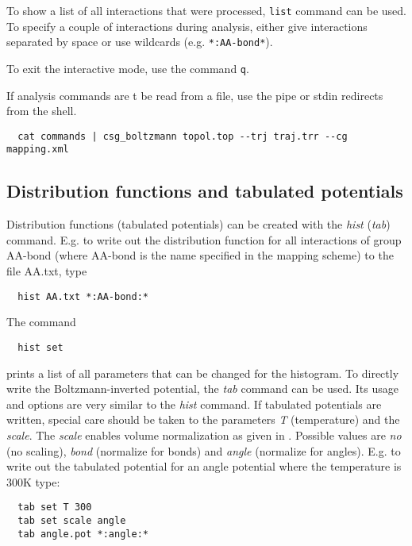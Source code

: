 To show a list of all interactions that were processed, \texttt{list} command can be used. To specify a couple of interactions during analysis, either give interactions separated by space or use wildcards (e.g. \texttt{*:AA-bond*}).

To exit the interactive mode, use the command \texttt{q}. 

If analysis commands are t be read from a file, use the pipe or stdin redirects from the shell.
\begin{verbatim}
  cat commands | csg_boltzmann topol.top --trj traj.trr --cg mapping.xml
\end{verbatim}

\subsection{Distribution functions and tabulated potentials}
Distribution functions (tabulated potentials) can be created with the \textit{hist} (\textit{tab}) command.
E.g. to write out the distribution function for all interactions of group AA-bond (where AA-bond is the name specified in the mapping scheme) to the file AA.txt, type
\begin{verbatim}
  hist AA.txt *:AA-bond:*
\end{verbatim}
The command
\begin{verbatim}
  hist set
\end{verbatim}
prints a list of all parameters that can be changed for the histogram. To directly write the Boltzmann-inverted potential, the \textit{tab} command can be used. Its usage and options are very similar to the \textit{hist} command. If tabulated potentials are written, special care should be taken to the parameters \textit{T} (temperature) and the \textit{scale}. The \textit{scale} enables volume normalization as given in . Possible values are \textit{no} (no scaling), \textit{bond} (normalize for bonds) and \textit{angle} (normalize for angles). E.g. to write out the tabulated potential for an angle potential where the temperature is 300K type:
\begin{verbatim}
  tab set T 300
  tab set scale angle
  tab angle.pot *:angle:*
\end{verbatim}


